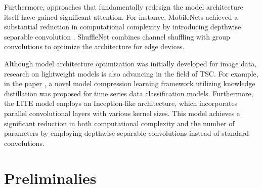 \documentclass[conference]{IEEEtran}
\begin{document}
Furthermore, approaches that fundamentally redesign the model architecture itself have gained significant attention. For instance, MobileNets \cite{DBLP:journals/corr/HowardZCKWWAA17} achieved a substantial reduction in computational complexity by introducing depthwise separable convolution \cite{8099678}. ShuffleNet \cite{8578814} combines channel shuffling with group convolutions to optimize the architecture for edge devices.

Although model architecture optimization was initially developed for image data, research on lightweight models is also advancing in the field of TSC. For example, in the paper \cite{9658841}, a novel model compression learning framework utilizing knowledge distillation was proposed for time series data classification models. Furthermore, the LITE model \cite{Ismail-Fawaz2023LITELightInception,ismail2025look} employs an Inception-like architecture, which incorporates parallel convolutional layers with various kernel sizes. This model achieves a significant reduction in both computational complexity and the number of parameters by employing depthwise separable convolutions instead of standard convolutions.

\section{Preliminalies}
\end{document}
